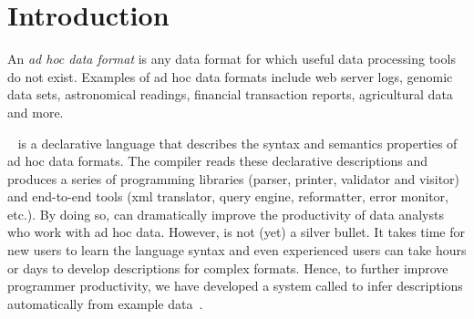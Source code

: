 \section{Introduction}\label{sec:intro}



An {\em ad hoc data format} is any data format for which useful data processing
tools do not exist.  Examples of ad hoc data formats include web server logs,
genomic data sets, astronomical readings, financial transaction reports, 
agricultural data and more.  

\pads~\cite{fisher+:pads,padsweb} is a declarative 
language that describes the syntax and semantics properties of ad hoc data
formats.  The \pads{} compiler reads these declarative descriptions
and produces a series of programming libraries (parser, printer, validator
and visitor) and end-to-end tools (xml translator, query engine, reformatter,
error monitor, etc.).  By doing so, \pads{} can dramatically improve the 
productivity of data analysts who work with ad hoc data.
However, \pads{} is not (yet) a silver bullet.  It takes time for new users
to learn the language syntax and even experienced users can take hours or 
days to develop descriptions for complex formats.  Hence, to further improve
programmer productivity, we have developed a system called \learnpads{}
to infer descriptions automatically from example 
data~\cite{fisher+:dirttoshovels,fisher+:sigmod08}.  


